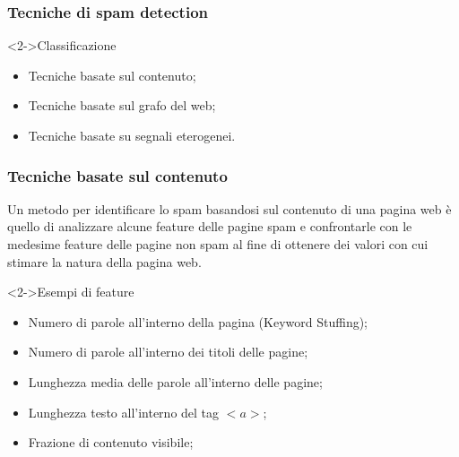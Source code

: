 \documentclass{beamer}
\begin{document}
 \begin{frame}
     \frametitle{Tecniche di spam detection}
     \begin{block}<2->{Classificazione}
     \begin{itemize}
     \item<3->Tecniche basate sul contenuto;	
     \item<4->Tecniche basate sul grafo del web;
     \item<5->Tecniche basate su segnali eterogenei.
     \end{itemize}
     \end{block}
 \end{frame}
\begin{frame}
    \frametitle{Tecniche basate sul contenuto}
    Un metodo per identificare lo spam basandosi sul contenuto di una pagina web è  quello di analizzare alcune feature delle pagine spam e confrontarle con le medesime feature delle pagine non spam al fine di ottenere dei valori con cui stimare la natura della pagina web.
    \begin{block}<2->{Esempi di feature}
    \begin{itemize}
    \item Numero di parole all'interno della pagina (Keyword Stuffing);
    \item Numero di parole all'interno dei titoli delle pagine;
    \item Lunghezza media delle parole all'interno delle pagine;
    \item Lunghezza testo all'interno del tag \(<a>\);
    \item Frazione di contenuto visibile;
    \end{itemize}
    \end{block}
\end{frame}
\end{document}
